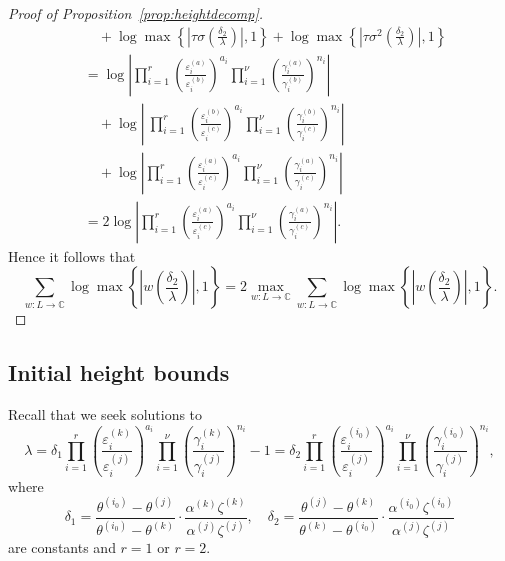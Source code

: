 \begin{proof}[Proof of Proposition~\ref{prop:heightdecomp}]
\begin{align*}
		& \quad+ \log \max \left\{ \left|\tau\sigma\left(\frac{\delta_2}{\lambda}\right)\right|, 1\right\} + \log \max \left\{ \left|\tau\sigma^2\left(\frac{\delta_2}{\lambda}\right)\right|, 1\right\}\\
	& = \log \left|\prod_{i = 1}^{r}\left( \frac{\varepsilon_i^{(a)}}{\varepsilon_i^{(b)}}\right)^{a_i} \prod_{i = 1}^{\nu} \left( \frac{\gamma_i^{(a)}}{\gamma_i^{(b)}}\right)^{n_i} \right|\\
		& \quad + \log \left|\ \prod_{i = 1}^{r}\left( \frac{\varepsilon_i^{(b)}}{\varepsilon_i^{(c)}}\right)^{a_i} \prod_{i = 1}^{\nu} \left( \frac{\gamma_i^{(b)}}{\gamma_i^{(c)}}\right)^{n_i} \right|\\
		& \quad+ \log \left| \prod_{i = 1}^{r}\left( \frac{\varepsilon_i^{(a)}}{\varepsilon_i^{(c)}}\right)^{a_i} \prod_{i = 1}^{\nu} \left( \frac{\gamma_i^{(a)}}{\gamma_i^{(c)}}\right)^{n_i} \right|\\
	& = 2\log  \left|\prod_{i = 1}^{r}\left( \frac{\varepsilon_i^{(a)}}{\varepsilon_i^{(c)}}\right)^{a_i} \prod_{i = 1}^{\nu} \left( \frac{\gamma_i^{(a)}}{\gamma_i^{(c)}}\right)^{n_i} \right|.
\end{align*}
Hence it follows that
\[\sum_{w :L \to \mathbb{C}} \log \max \left\{ \left|w\left(\frac{\delta_2}{\lambda}\right)\right|, 1\right\} = 
2\max_{w:L\to \mathbb{C}}\sum_{w :L \to \mathbb{C}} \log \max \left\{ \left|w\left(\frac{\delta_2}{\lambda}\right)\right|, 1\right\}.\]
\end{proof}

\subsection{Initial height bounds}

Recall that we seek solutions to
\begin{equation*}
\lambda = \delta_1 \prod_{i = 1}^r\left( \frac{\varepsilon_i^{(k)}}{\varepsilon_i^{(j)}}\right)^{a_i}\prod_{i = 1}^{\nu} \left( \frac{\gamma_i^{(k)}}{\gamma_i^{(j)}}\right)^{n_i} - 1 = \delta_2 \prod_{i = 1}^{r}\left( \frac{\varepsilon_i^{(i_0)}}{\varepsilon_i^{(j)}}\right)^{a_i} \prod_{i = 1}^{\nu} \left( \frac{\gamma_i^{(i_0)}}{\gamma_i^{(j)}}\right)^{n_i},
\end{equation*}
where
\[\delta_1 = \frac{\theta^{(i_0)} - \theta^{(j)}}{\theta^{(i_0)} - \theta^{(k)}}\cdot\frac{\alpha^{(k)}\zeta^{(k)}}{\alpha^{(j)}\zeta^{(j)}}, \quad \delta_2 = \frac{\theta^{(j)} - \theta^{(k)}}{\theta^{(k)} - \theta^{(i_0)}}\cdot \frac{\alpha^{(i_0)}\zeta^{(i_0)}}{\alpha^{(j)}\zeta^{(j)}}\]
are constants and $r = 1$ or $r = 2$. 

